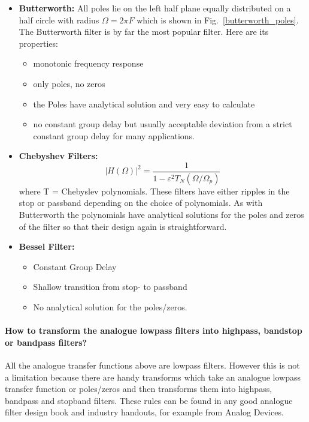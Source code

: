\documentclass[12pt,a4paper]{article}
\begin{document}
\begin{itemize}
\item {\bf Butterworth:} All poles lie on the left half plane
  equally distributed on a half circle with radius $\Omega = 2\pi F$ which
  is shown in Fig.~\ref{butterworth_poles}. The Butterworth filter
  is by far the most popular filter. Here are its properties:
\begin{itemize} 
\item monotonic frequency response
\item only poles, no zeros
\item the Poles have analytical solution and very easy to calculate
\item no constant group delay but usually acceptable deviation from
  a strict constant group delay for many applications.
\end{itemize}

\item {\bf Chebyshev Filters:}
\begin{equation} 
|H(\Omega)|^{2} = \frac{1}{1 - \varepsilon^{2} T_{N} (\Omega/\Omega_{p})}
\end{equation}
where T = Chebyslev polynomials. These filters have either ripples
in the stop or passband depending on the choice of polynomials.
As with Butterworth the polynomials have analytical solutions for
the poles and zeros of the filter so that their design again is
straightforward.

\item {\bf Bessel Filter: }
\begin{itemize} 
\item Constant Group Delay
\item Shallow transition from stop- to passband
\item No analytical solution for the poles/zeros.
\end{itemize}
\end{itemize}

\paragraph{How to transform the analogue lowpass filters into
  highpass, bandstop or bandpass filters?}
All the analogue transfer functions above are lowpass
filters. However this is not a limitation because there are handy transforms
which take an analogue lowpass transfer function or poles/zeros
and then transforms them into highpass, bandpass and stopband
filters. These rules can be found in any good analogue filter
design book and industry handouts, for example from Analog Devices.
\end{document}
